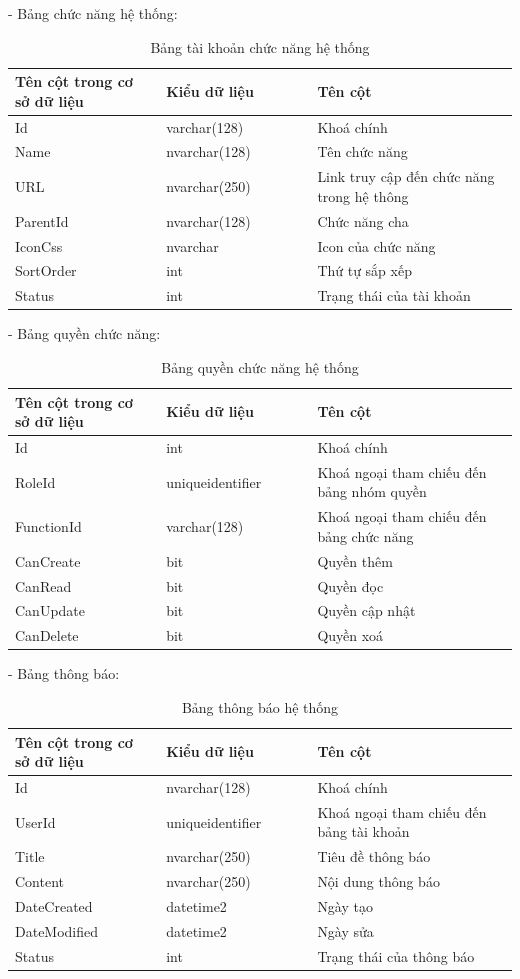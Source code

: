 - Bảng chức năng hệ thống:
\begin{longtable}[htp]{ |m{0.3\linewidth}|m{0.3\linewidth}|m{0.4\linewidth}|}
 \caption{Bảng tài khoản chức năng hệ thống \label{database}}\\
 \hline
 Tên cột trong cơ sở dữ liệu & Kiểu dữ liệu & Tên cột  \\
 \hline
  Id&varchar(128)&Khoá chính\\
 \hline
  Name&nvarchar(128)&Tên chức năng\\
 \hline
  URL&nvarchar(250)&Link truy cập đến chức năng trong hệ thông\\
 \hline
  ParentId&nvarchar(128)& Chức năng cha\\
 \hline
  IconCss&nvarchar&Icon của chức năng\\
 \hline
  SortOrder&int&Thứ tự sắp xếp\\
 \hline
  Status&int&Trạng thái của tài khoản\\
 \hline
\end{longtable}

- Bảng quyền chức năng:
\begin{longtable}[htp]{ |m{0.3\linewidth}|m{0.3\linewidth}|m{0.4\linewidth}|}
 \caption{Bảng quyền chức năng hệ thống \label{database}}\\
 \hline
 Tên cột trong cơ sở dữ liệu & Kiểu dữ liệu & Tên cột  \\
 \hline
  Id&int&Khoá chính\\
 \hline
  RoleId&uniqueidentifier&Khoá ngoại tham chiếu đến bảng nhóm quyền\\
 \hline
  FunctionId&varchar(128)&Khoá ngoại tham chiếu đến bảng chức năng\\
 \hline
  CanCreate&bit& Quyền thêm\\
 \hline
  CanRead&bit&Quyền đọc\\
 \hline
  CanUpdate&bit&Quyền cập nhật\\
 \hline
  CanDelete&bit&Quyền xoá\\
 \hline
\end{longtable}

- Bảng thông báo:
\begin{longtable}[htp]{ |m{0.3\linewidth}|m{0.3\linewidth}|m{0.4\linewidth}|}
 \caption{Bảng thông báo hệ thống \label{database}}\\
 \hline
 Tên cột trong cơ sở dữ liệu & Kiểu dữ liệu & Tên cột  \\
 \hline
  Id&nvarchar(128)&Khoá chính\\
 \hline
  UserId&uniqueidentifier&Khoá ngoại tham chiếu đến bảng tài khoản\\
 \hline
  Title&nvarchar(250)&Tiêu đề thông báo\\
 \hline
  Content&nvarchar(250)& Nội dung thông báo\\
 \hline
  DateCreated&datetime2&Ngày tạo\\
 \hline
  DateModified&datetime2&Ngày sửa\\
 \hline
  Status&int&Trạng thái của thông báo\\
 \hline
\end{longtable}

